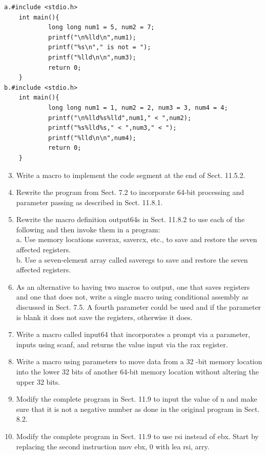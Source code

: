 \documentclass[10pt]{book}
\begin{document}
\begin{verbatim}
a.#include <stdio.h>
    int main(){
            long long num1 = 5, num2 = 7;
            printf("\n%lld\n",num1);
            printf("%s\n"," is not = ");
            printf("%lld\n\n",num3);
            return 0;
    }
b.#include <stdio.h>
    int main(){
            long long num1 = 1, num2 = 2, num3 = 3, num4 = 4;
            printf("\n%lld%s%lld",num1," < ",num2);
            printf("%s%lld%s," < ",num3," < ");
            printf("%lld\n\n",num4);
            return 0;
    }
\end{verbatim}

\begin{enumerate}
  \setcounter{enumi}{2}
  \item Write a macro to implement the code segment at the end of Sect. 11.5.2.
  \item Rewrite the program from Sect. 7.2 to incorporate 64-bit processing and parameter passing as described in Sect. 11.8.1.
  \item Rewrite the macro definition output64s in Sect. 11.8.2 to use each of the following and then invoke them in a program:\\
a. Use memory locations saverax, savercx, etc., to save and restore the seven affected registers.\\
b. Use a seven-element array called saveregs to save and restore the seven affected registers.
  \item As an alternative to having two macros to output, one that saves registers and one that does not, write a single macro using conditional assembly as discussed in Sect. 7.5. A fourth parameter could be used and if the parameter is blank it does not save the registers, otherwise it does.
  \item Write a macro called input64 that incorporates a prompt via a parameter, inputs using scanf, and returns the value input via the rax register.
  \item Write a macro using parameters to move data from a 32 -bit memory location into the lower 32 bits of another 64-bit memory location without altering the upper 32 bits.
  \item Modify the complete program in Sect. 11.9 to input the value of n and make sure that it is not a negative number as done in the original program in Sect. 8.2.
  \item Modify the complete program in Sect. 11.9 to use rsi instead of ebx. Start by replacing the second instruction mov ebx, 0 with lea rsi, arry.
\end{enumerate}
\end{document}

